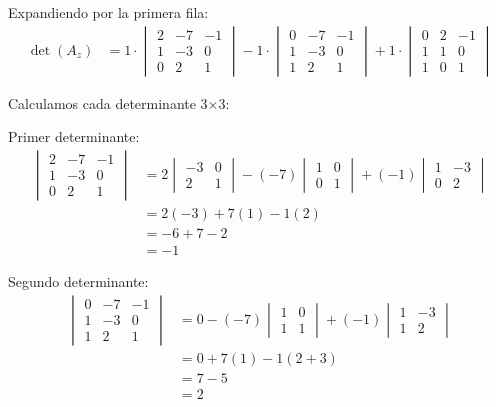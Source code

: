 \documentclass{article}
\begin{document}
Expandiendo por la primera fila:
\begin{align}
    \det(A_z) &= 1 \cdot \begin{vmatrix} 2 & -7 & -1 \\ 1 & -3 & 0 \\ 0 & 2 & 1 \end{vmatrix} - 1 \cdot \begin{vmatrix} 0 & -7 & -1 \\ 1 & -3 & 0 \\ 1 & 2 & 1 \end{vmatrix} + 1 \cdot \begin{vmatrix} 0 & 2 & -1 \\ 1 & 1 & 0 \\ 1 & 0 & 1 \end{vmatrix}
\end{align}

Calculamos cada determinante 3×3:

Primer determinante:
\begin{align}
    \begin{vmatrix} 2 & -7 & -1 \\ 1 & -3 & 0 \\ 0 & 2 & 1 \end{vmatrix} &= 2 \begin{vmatrix} -3 & 0 \\ 2 & 1 \end{vmatrix} - (-7) \begin{vmatrix} 1 & 0 \\ 0 & 1 \end{vmatrix} + (-1) \begin{vmatrix} 1 & -3 \\ 0 & 2 \end{vmatrix} \\
    &= 2(-3) + 7(1) - 1(2) \\
    &= -6 + 7 - 2 \\
    &= -1
\end{align}

Segundo determinante:
\begin{align}
    \begin{vmatrix} 0 & -7 & -1 \\ 1 & -3 & 0 \\ 1 & 2 & 1 \end{vmatrix} &= 0 - (-7) \begin{vmatrix} 1 & 0 \\ 1 & 1 \end{vmatrix} + (-1) \begin{vmatrix} 1 & -3 \\ 1 & 2 \end{vmatrix} \\
    &= 0 + 7(1) - 1(2 + 3) \\
    &= 7 - 5 \\
    &= 2
\end{align}
\end{document}
